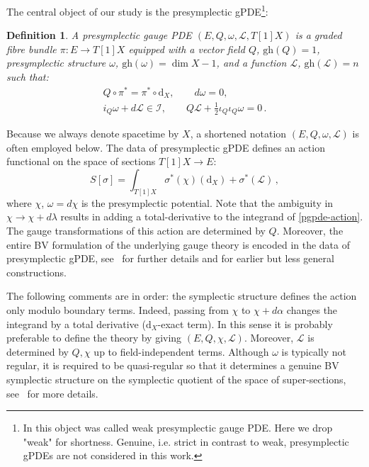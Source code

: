 \documentclass[a4paper,12pt]{article}
\numberwithin{equation}{section} %
\newtheorem{definition}[thm]{Definition}
\newcommand{\gh}[1]{\mathrm{gh}(#1)}
\newcommand{\dx}{\mathrm{d}_X}
\newcommand{\hhalf}{\frac{1}{2}}
\def\cI{\mathcal{I}}
\def\cL{\mathcal{L}}
\begin{document}
The central object of our study is the presymplectic gPDE\footnote{In \cite{Grigoriev:2022zlq,Dneprov:2024cvt} this object was called weak presymplectic gauge PDE. Here we drop "weak" for shortness. Genuine, i.e. strict in contrast to weak, presymplectic gPDEs are not considered in this work.}:
\begin{definition}
	A \textit{presymplectic gauge PDE} $(E,Q,\omega,\cL,T[1]X)$ is a graded fibre bundle $\pi:E\rightarrow T[1]X$ equipped with a
    vector field $Q$, $\gh{Q}=1$, presymplectic structure $\omega$, $\gh{\omega}=\dim X-1$, and a function $\cL$, $\gh{\cL}=n$ such that:
	\begin{gather}
		Q\circ\pi^* = \pi^*\circ \dx, \qquad d\omega = 0, \\ 
        \label{iqomega}
        i_Q\omega+d\cL \in \cI, \qquad Q\cL+\hhalf \iota_Q\iota_Q \omega = 0\,. 
	\end{gather}
\end{definition}
Because we always denote spacetime by $X$, a shortened notation $(E,Q,\omega,\cL)$ is often employed below.  The 
data of presymplectic gPDE defines an action functional on the space of sections $T[1]X\to E$:
\begin{equation}
\label{pgpde-action}
S[\sigma]=\int_{T[1]X}\sigma^*(\chi)(\dx)+\sigma^*(\cL)\,,
\end{equation}
where $\chi$, $\omega=d\chi$ is the presymplectic potential.  Note that the ambiguity in $\chi \to \chi +d\lambda$ results in adding a total-derivative to the integrand of \eqref{pgpde-action}.
The gauge transformations of this action are determined by $Q$. Moreover,
the entire BV formulation of the underlying gauge theory is encoded in 
the data of presymplectic gPDE, see~\cite{Grigoriev:2022zlq,Dneprov:2024cvt} for further details and \cite{Alkalaev:2013hta,Grigoriev:2016wmk,Grigoriev:2020xec,Dneprov:2022jyn} for earlier but less general constructions. 

The following comments are in order: the symplectic structure defines
 the action only modulo boundary terms. Indeed, passing from $\chi$ to $\chi+d\alpha$ changes the integrand by a total derivative ($\dx$-exact term). In this sense it is probably preferable to define the theory by giving $(E,Q,\chi,\cL)$. Moreover, $\cL$ is determined by $Q,\chi$ up to field-independent terms. Although $\omega$ is typically not regular, it is required to be quasi-regular so that it determines a genuine BV symplectic structure on the symplectic quotient of the space of super-sections, see~\cite{Dneprov:2024cvt,Grigoriev:2024ncm} for more details.
\end{document}
